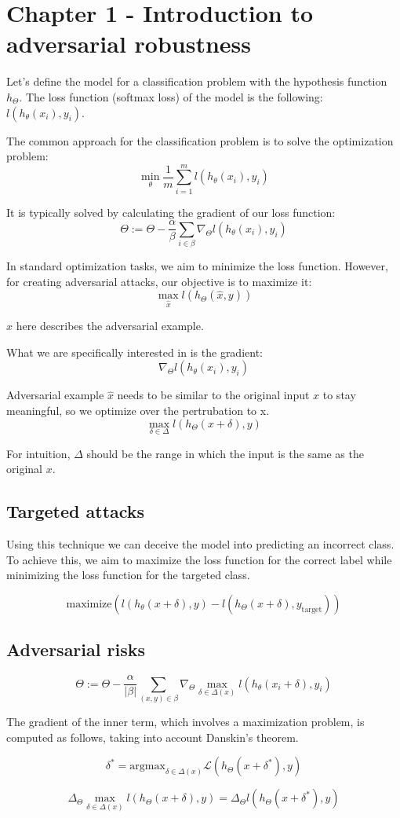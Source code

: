 \section{Chapter 1 - Introduction to adversarial robustness}
Let's define the model for a classification problem with the hypothesis function $h_\Theta$.  The loss function (softmax loss) of the model is the following:
$l(h_{\theta}(x_{i}), y_{i})$.




The common approach for the classification problem is to solve the optimization problem:
\[\min_{\theta} \frac{1}{m} \sum_{i=1}^{m} l(h_{\theta}(x_{i}), y_{i})\]

It is typically solved by calculating the gradient of our loss function:
\[ \Theta := \Theta - \dfrac{\alpha}{\beta} \sum_{i \in \beta} \nabla_\Theta l (h_{\theta}(x_{i}), y_{i}) \]

In standard optimization tasks, we aim to minimize the loss function. However, for creating adversarial attacks, our objective is to maximize it:
\[\max_{\hat{x}} l(h_{\Theta}(\hat{x}, y))\]

$\hat x$ here describes the adversarial example.

What we are specifically interested in is the gradient:
\[  \nabla_\Theta l (h_{\theta}(x_{i}), y_{i}) \]

Adversarial example $\hat{x}$ needs to be similar to the original input $x$ to stay meaningful, so we optimize over the pertrubation to x.
\[\max_{\delta \in \Delta} l (h_{\Theta}(x+\delta), y)\]

For intuition, $\Delta$ should be the range in which the input is the same as the original $x$.


\subsection{Targeted attacks}
Using this technique we can deceive the model into predicting an incorrect class. To achieve this, we aim to maximize the loss function for the correct label while minimizing the loss 
function for the targeted class. 

\[\text{maximize} \left( l(h_{\theta}(x + \delta), y) - l(h_{\Theta}(x + \delta), y_{\text{target}}) \right)
\]


\subsection{Adversarial risks}

\[ \Theta := \Theta - \dfrac{\alpha}{|\beta|} \sum_{(x, y) \in \beta} \nabla_\Theta \max_{\delta \in \Delta(x)} l (h_{\theta}(x_{i}+\delta), y_{i}) \]


The gradient of the inner term, which involves a maximization problem, is computed as follows, taking into account Danskin's theorem.%

\[\delta^* = \text{argmax}_{\delta \in \Delta(x)} \mathcal{L}(h_{\Theta}(x + \delta^*), y)\]

\[\Delta_\Theta \max_{\delta \in \Delta(x)} l (h_\Theta(x+\delta), y) = \Delta_\Theta l (h_\Theta(x + \delta^*), y)\]